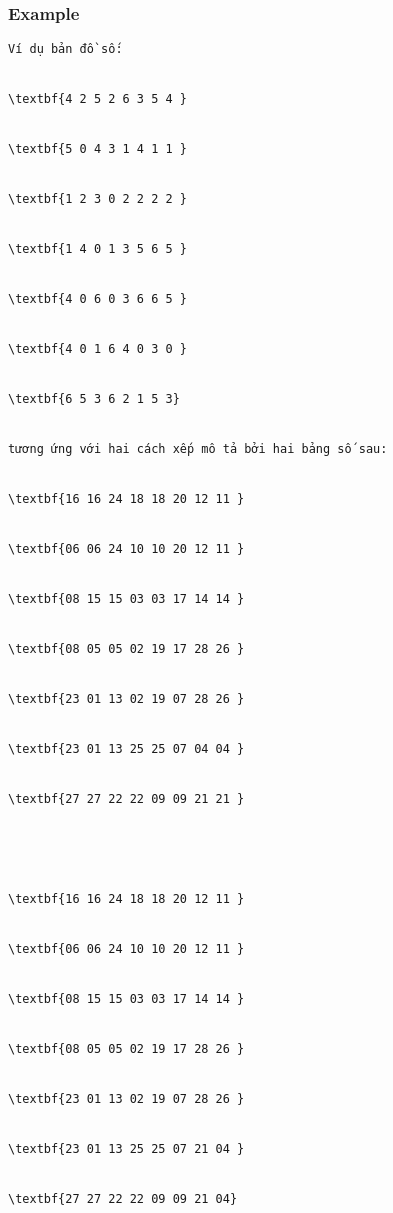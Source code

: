 \subsubsection{   Example  }
\begin{verbatim}
Ví dụ bản đồ số:


\textbf{4 2 5 2 6 3 5 4 }


\textbf{5 0 4 3 1 4 1 1 }


\textbf{1 2 3 0 2 2 2 2 }


\textbf{1 4 0 1 3 5 6 5 }


\textbf{4 0 6 0 3 6 6 5 }


\textbf{4 0 1 6 4 0 3 0 }


\textbf{6 5 3 6 2 1 5 3} 


tương ứng với hai cách xếp mô tả bởi hai bảng số sau:


\textbf{16 16 24 18 18 20 12 11 }


\textbf{06 06 24 10 10 20 12 11 }


\textbf{08 15 15 03 03 17 14 14 }


\textbf{08 05 05 02 19 17 28 26 }


\textbf{23 01 13 02 19 07 28 26 }


\textbf{23 01 13 25 25 07 04 04 }


\textbf{27 27 22 22 09 09 21 21 }





\textbf{16 16 24 18 18 20 12 11 }


\textbf{06 06 24 10 10 20 12 11 }


\textbf{08 15 15 03 03 17 14 14 }


\textbf{08 05 05 02 19 17 28 26 }


\textbf{23 01 13 02 19 07 28 26 }


\textbf{23 01 13 25 25 07 21 04 }


\textbf{27 27 22 22 09 09 21 04}\end{verbatim}
